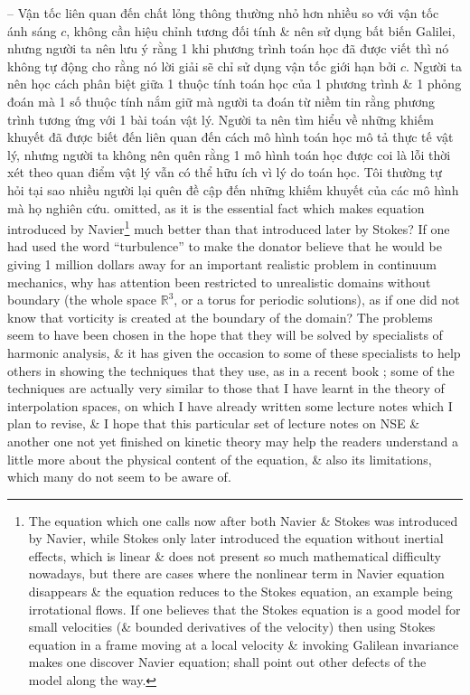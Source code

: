 \documentclass{article}
\begin{document}
\begin{enumerate}
{	-- Vận tốc liên quan đến chất lỏng thông thường nhỏ hơn nhiều so với vận tốc ánh sáng $c$, không cần hiệu chỉnh tương đối tính \& nên sử dụng bất biến Galilei, nhưng người ta nên lưu ý rằng 1 khi phương trình toán học đã được viết thì nó không tự động cho rằng nó lời giải sẽ chỉ sử dụng vận tốc giới hạn bởi $c$. Người ta nên học cách phân biệt giữa 1 thuộc tính toán học của 1 phương trình \& 1 phỏng đoán mà 1 số thuộc tính nắm giữ mà người ta đoán từ niềm tin rằng phương trình tương ứng với 1 bài toán vật lý. Người ta nên tìm hiểu về những khiếm khuyết đã được biết đến liên quan đến cách mô hình toán học mô tả thực tế vật lý, nhưng người ta không nên quên rằng 1 mô hình toán học được coi là lỗi thời xét theo quan điểm vật lý vẫn có thể hữu ích vì lý do toán học. Tôi thường tự hỏi tại sao nhiều người lại quên đề cập đến những khiếm khuyết của các mô hình mà họ nghiên cứu.} omitted, as it is the essential fact which makes equation introduced by {\sc Navier}\footnote{The equation which one calls now after both {\sc Navier \& Stokes} was introduced by {\sc Navier}, while {\sc Stokes} only later introduced the equation without inertial effects, which is linear \& does not present so much mathematical difficulty nowadays, but there are cases where the nonlinear term in Navier equation disappears \& the equation reduces to the Stokes equation, an example being irrotational flows. If one believes that the Stokes equation is a good model for small velocities (\& bounded derivatives of the velocity) then using Stokes equation in a frame moving at a local velocity \& invoking Galilean invariance makes one discover Navier equation; shall point out other defects of the model along the way.} much better than that introduced later by {\sc Stokes}? If one had used the word ``turbulence'' to make the donator believe that he would be giving 1 million dollars away for an important realistic problem in continuum mechanics, why has attention been restricted to unrealistic domains without boundary (the whole space $\mathbb{R}^3$, or a torus for periodic solutions), as if one did not know that vorticity is created at the boundary of the domain? The problems seem to have been chosen in the hope that they will be solved by specialists of harmonic analysis, \& it has given the occasion to some of these specialists to help others in showing the techniques that they use, as in a recent book  \cite{Lemarie-Rieusset2002}; some of the techniques are actually very similar to those that I have learnt in the theory of interpolation spaces, on which I have already written some lecture notes which I plan to revise, \& I hope that this particular set of lecture notes on NSE \& another one not yet finished on kinetic theory may help the readers understand a little more about the physical content of the equation, \& also its limitations, which many do not seem to be aware of.
	

\end{enumerate}
\end{document}
